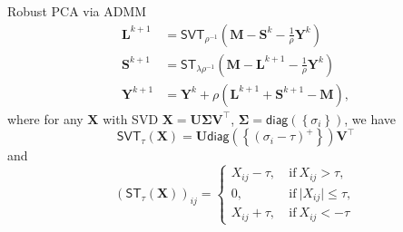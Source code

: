 \documentclass[aspectratio=169]{beamer}
\begin{document}
                \begin{frame}{Robust PCA via ADMM}
                  \begin{align*}
                    \bm L^{k+1} &= \textsf{SVT}_{\rho^{-1}}\left(\bm M - \bm S^k - \frac{1}{\rho}\bm Y^k\right)\\
                    \bm S^{k+1} &= \textsf{ST}_{\lambda \rho^{-1}}\left(\bm M - \bm L^{k+1} - \frac{1}{\rho}\bm Y^k\right) \\
                    \bm Y^{k+1} &= \bm Y^k + \rho \left(\bm L^{k+1} + \bm S^{k+1} - \bm M\right),
                  \end{align*}
                  where for any $\bm X$ with \textsf{SVD} $\bm X = \bm U \boldsymbol \Sigma \bm V^\top$, $\boldsymbol \Sigma = \textsf{diag}\left(\left\{\sigma_i\right\}\right)$, we have
                  \begin{equation*}
                    \textsf{SVT}_{\tau}\left(\bm X\right) = \bm U \textsf{diag}\left(\left\{(\sigma_i - \tau)^{+}\right\}\right)\bm V ^\top
                  \end{equation*}
                  and
                  \begin{equation*}
                     \left(\textsf{ST}_{\tau}\left(\bm X\right)\right)_{ij} = 
                    \begin{cases}
                      X_{ij} - \tau, & ~\text{if}~ X_{ij} > \tau,\\
                      0, & ~\text{if}~ \vert X_{ij}\vert \leq \tau, \\
                      X_{ij} + \tau, & ~\text{if}~ X_{ij} < -\tau
                    \end{cases}
                  \end{equation*}
                \end{frame}
\end{document}
